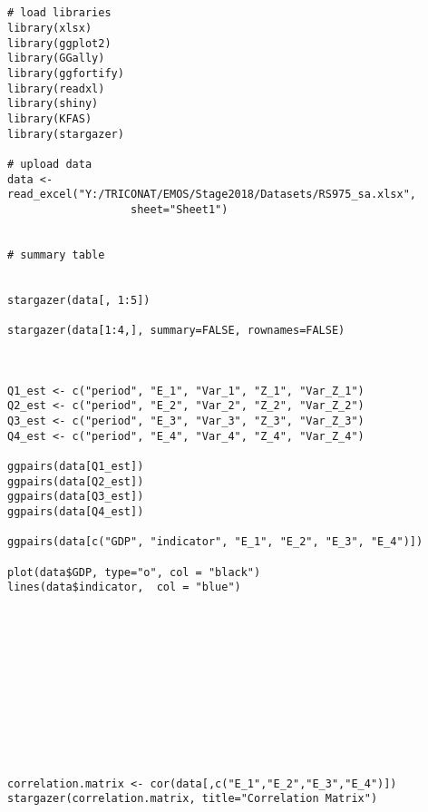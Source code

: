 
\begin{lstlisting}





# load libraries
library(xlsx)
library(ggplot2)
library(GGally)
library(ggfortify)
library(readxl)
library(shiny)
library(KFAS)
library(stargazer)

# upload data
data <- read_excel("Y:/TRICONAT/EMOS/Stage2018/Datasets/RS975_sa.xlsx",
                   sheet="Sheet1")


# summary table


stargazer(data[, 1:5])

stargazer(data[1:4,], summary=FALSE, rownames=FALSE)



Q1_est <- c("period", "E_1", "Var_1", "Z_1", "Var_Z_1")
Q2_est <- c("period", "E_2", "Var_2", "Z_2", "Var_Z_2")
Q3_est <- c("period", "E_3", "Var_3", "Z_3", "Var_Z_3")
Q4_est <- c("period", "E_4", "Var_4", "Z_4", "Var_Z_4")

ggpairs(data[Q1_est])
ggpairs(data[Q2_est])
ggpairs(data[Q3_est])
ggpairs(data[Q4_est])

ggpairs(data[c("GDP", "indicator", "E_1", "E_2", "E_3", "E_4")])

plot(data$GDP, type="o", col = "black")
lines(data$indicator,  col = "blue")












correlation.matrix <- cor(data[,c("E_1","E_2","E_3","E_4")])
stargazer(correlation.matrix, title="Correlation Matrix")


\end{lstlisting}
